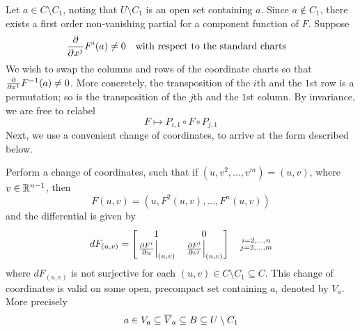 \documentclass[../main-manifolds.tex]{subfiles}
\begin{document}
\begin{step}\label{lee-sards-case1}
    
\end{step}
Let $a\in C\setminus C_1$, noting that $U\setminus C_1$ is an open set containing $a$. Since $a\notin C_1$, there exists a first order non-vanishing partial for a component function of $F$. Suppose 
\[
    \pdv{x^j}F^{i}(a)\neq 0\qqtext{with respect to the standard charts}
\]
We wish to swap the columns and rows of the coordinate charts so that $\pdv{x^1}F^{-1}(a)\neq 0$. More concretely, the transposition of the $i$th and the $1$st row is a permutation; so is the transposition of the $j$th and the $1$st column. By invariance, we are free to relabel
\[
    F\mapsto P_{i,1}\circ F\circ P_{j,1}
\]
Next, we use a convenient change of coordinates, to arrive at the form described below.
\begin{step}
    Perform a change of coordinates, such that if $(u,v^2,\ldots,v^m) = (u,v)$, where $v\in\mathbb{R}^{n-1}$, then
    \begin{equation}\label{lee-sards-eq-6.2a}
        F(u,v) = (u,F^2(u,v), \ldots, F^n(u,v))
    \end{equation}
    and the differential is given by
    \begin{equation}\label{lee-sards-eq-6.2b}
        dF_{(u,v)} = \begin{bmatrix}
            1&0\\ \eval{\pdv{F^i}{u}}_{(u,v)} & \eval{\pdv{F^i}{v^j}}_{(u,v)}
        \end{bmatrix}\quad \substack{i=2,\ldots,n\\ j=2,\ldots,m}
    \end{equation}
    where $dF_{(u,v)}$ is not surjective for each $(u,v)\in C\setminus C_1\subseteq C$. This change of coordinates is valid on some open, precompact set containing $a$, denoted by $V_a$. More precisely
    \begin{equation}\label{lee-sards-precompact}
    a\in V_a\subseteq\overline{V}_a\subseteq B\subseteq U\setminus C_1
    \end{equation}
\end{step}
\end{document}
